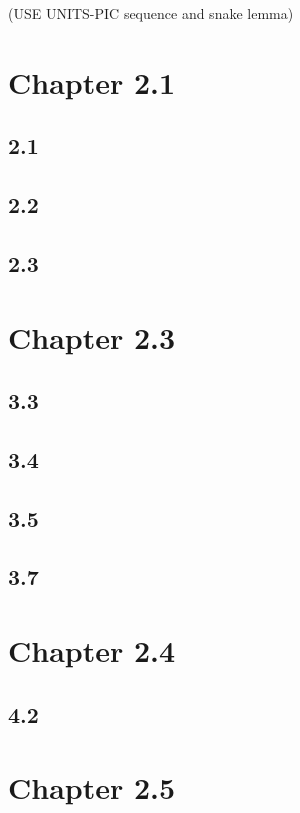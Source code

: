 \documentclass[12pt]{article}
\begin{document}
(USE UNITS-PIC sequence and snake lemma)

\section{Chapter 2.1}

\subsection{2.1}

\subsection{2.2}

\subsection{2.3}

\section{Chapter 2.3}

\subsection{3.3}

\subsection{3.4}

\subsection{3.5}

\subsection{3.7}

\section{Chapter 2.4}

\subsection{4.2}

\section{Chapter 2.5}
\end{document}
